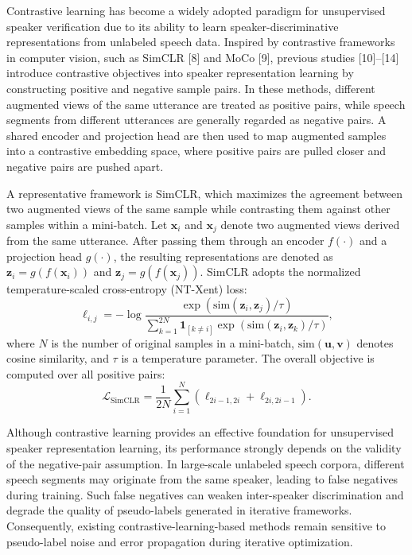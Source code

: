 \documentclass[lettersize,journal]{IEEEtran}
\begin{document}
Contrastive learning has become a widely adopted paradigm for unsupervised speaker verification due to its ability to learn speaker-discriminative representations from unlabeled speech data. Inspired by contrastive frameworks in computer vision, such as SimCLR [8] and MoCo [9], previous studies [10]--[14] introduce contrastive objectives into speaker representation learning by constructing positive and negative sample pairs. In these methods, different augmented views of the same utterance are treated as positive pairs, while speech segments from different utterances are generally regarded as negative pairs. A shared encoder and projection head are then used to map augmented samples into a contrastive embedding space, where positive pairs are pulled closer and negative pairs are pushed apart.

A representative framework is SimCLR, which maximizes the agreement between two augmented views of the same sample while contrasting them against other samples within a mini-batch. Let $\mathbf{x}_i$ and $\mathbf{x}_j$ denote two augmented views derived from the same utterance. After passing them through an encoder $f(\cdot)$ and a projection head $g(\cdot)$, the resulting representations are denoted as $\mathbf{z}_i=g(f(\mathbf{x}_i))$ and $\mathbf{z}_j=g(f(\mathbf{x}_j))$. SimCLR adopts the normalized temperature-scaled cross-entropy (NT-Xent) loss:
\begin{equation}
\ell_{i,j}=-\log \frac{\exp\left(\mathrm{sim}(\mathbf{z}_i,\mathbf{z}_j)/\tau\right)}
{\sum\limits_{k=1}^{2N}\mathbf{1}_{[k\neq i]}\exp\left(\mathrm{sim}(\mathbf{z}_i,\mathbf{z}_k)/\tau\right)},
\end{equation}
where $N$ is the number of original samples in a mini-batch, $\mathrm{sim}(\mathbf{u},\mathbf{v})$ denotes cosine similarity, and $\tau$ is a temperature parameter. The overall objective is computed over all positive pairs:
\begin{equation}
\mathcal{L}_{\mathrm{SimCLR}}
=
\frac{1}{2N}
\sum_{i=1}^{N}
\left(
\ell_{2i-1,2i}
+
\ell_{2i,2i-1}
\right).
\end{equation}

Although contrastive learning provides an effective foundation for unsupervised speaker representation learning, its performance strongly depends on the validity of the negative-pair assumption. In large-scale unlabeled speech corpora, different speech segments may originate from the same speaker, leading to false negatives during training. Such false negatives can weaken inter-speaker discrimination and degrade the quality of pseudo-labels generated in iterative frameworks. Consequently, existing contrastive-learning-based methods remain sensitive to pseudo-label noise and error propagation during iterative optimization.
\end{document}
